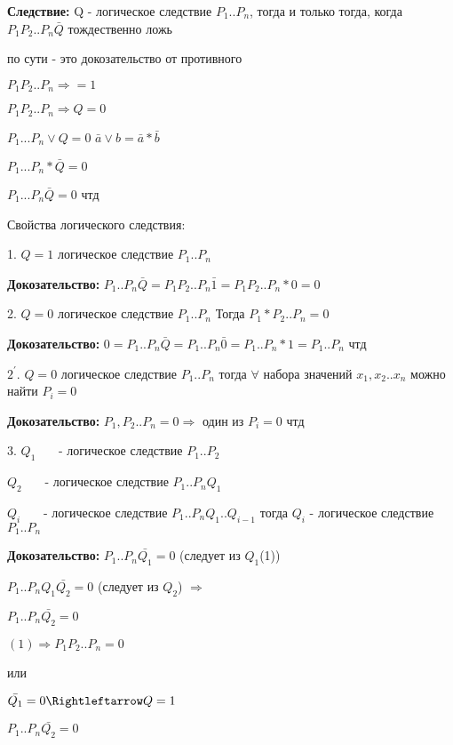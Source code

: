 \documentclass[russian]{lecture-notes}
\begin{document}
	\textbf{Следствие:} Q - логическое следствие $P_{1}..P_{n}$, тогда и только тогда, когда $P_{1}P_{2}..P_{n}\bar{Q}$ тождественно ложь

	\begin{remark}
		по сути - это докозательство от противного
		\end{remark}

	$P_{1}P_{2}..P_{n} \Rightarrow = 1$

	$P_{1}P_{2}..P_{n} \Rightarrow Q = 0 $

	$P_{1} ... P_{n} \lor Q = 0$ \quad $\bar{a} \lor b = \bar{a} * \bar{b}$

	$P_{1}... P_{n} * \bar{Q} = 0$

	$P_{1} ... P_{n} \bar{Q} = 0$ чтд

	Свойства логического следствия:

	1. $Q = 1$ логическое следствие $P_{1}..P_{n}$

	\textbf{Докозательство:} $P_{1}..P_{n} \bar{Q} = P_{1}P_{2}..P_{n} \bar{1} = P_{1}P_{2}..P_{n}*0 = 0$

	2. $Q = 0$ логическое следствие $P_{1}..P_{n}$
	Тогда $P_{1}*P_{2}..P_{n}=0$

	\textbf{Докозательство:} $0 = P_{1}..P_{n} \bar{Q} = P_{1}..P_{n} \bar{0} = P_{1}..P_{n}*1 = P_{1}..P_{n}$ чтд

	$2^{'}.$ $Q=0$ логическое следствие $P_{1}..P_{n}$ тогда $\forall$ набора значений $x_{1},x_{2}..x_{n}$ можно найти $P_{i}=0$

	\textbf{Докозательство: } $P_{1},P_{2}..P_{n} = 0 \Rightarrow $ один из $P_{i} = 0$ чтд

	3. $Q_{1}$ ~~~- логическое следствие $P_{1}..P_{2}$

	$Q_{2}$ ~~~- логическое следствие $P_{1}..P_{n} Q_{1}$

	$Q_{i}$ ~~~- логическое следствие $P_{1}..P_{n} Q_{1}..Q_{i-1}$ тогда $Q_{i}$ - логическое следствие $P_{1}..P_{n}$

	\textbf{Докозательство: } $P_{1}..P_{n} \bar{Q_{1}} = 0$ (следует из $Q_{1}$(1))

	$P_{1}..P_{n} Q_{1}\bar{Q_{2}} = 0$ (следует из $Q_{2}$) $\Rightarrow$

	$P_{1}..P_{n} \bar{Q_{2}} = 0$

	$(1) \Rightarrow P_{1}P_{2}..P_{n} = 0 $

	или

	$\bar{Q_{1}} = 0 \Rightleftarrow Q = 1$

	$P_{1}..P_{n} \bar{Q_{2}} = 0$
\end{document}
